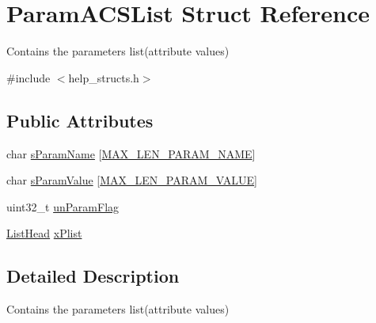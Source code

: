 \hypertarget{structParamACSList}{\section{Param\-A\-C\-S\-List Struct Reference}
\label{structParamACSList}
}


Contains the parameters list(attribute values)  




{\ttfamily \#include $<$help\-\_\-structs.\-h$>$}

\subsection*{Public Attributes}
\begin{DoxyCompactItemize}
\item 
char \hyperlink{structParamACSList_a6f10f6d98eee67fbe3467a96d1b4568b}{s\-Param\-Name} \mbox{[}\hyperlink{group__LIBHELP_gaac5d922b6e3eb48b7ba829979fd73ae2}{M\-A\-X\-\_\-\-L\-E\-N\-\_\-\-P\-A\-R\-A\-M\-\_\-\-N\-A\-M\-E}\mbox{]}
\item 
char \hyperlink{structParamACSList_a6360e9d86e6060e2c030288ca13f7975}{s\-Param\-Value} \mbox{[}\hyperlink{group__LIBHELP_ga1b79b737d896845c1c07d942ffbfe3fa}{M\-A\-X\-\_\-\-L\-E\-N\-\_\-\-P\-A\-R\-A\-M\-\_\-\-V\-A\-L\-U\-E}\mbox{]}
\item 
uint32\-\_\-t \hyperlink{structParamACSList_a91e0b1df78a7d043503337e3c149c7fa}{un\-Param\-Flag}
\item 
\hyperlink{group__LIBHELP_ga73f73d414f252ff46652f16495641187}{List\-Head} \hyperlink{structParamACSList_a519fcf46a0947e661e022ebfbb4af1e8}{x\-Plist}
\end{DoxyCompactItemize}


\subsection{Detailed Description}
Contains the parameters list(attribute values) 

